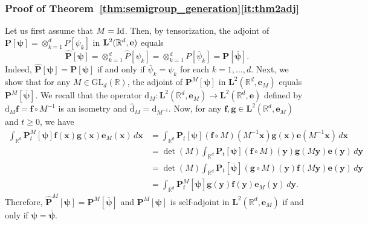 \documentclass[12pt]{amsart}
\numberwithin{equation}{section}
\newcommand{\bb}{\mathbb}
\renewcommand{\ge}{\geqslant}
\newcommand{\ov}{\overline}
\newcommand{\bmrm}[2][2]{\mathbf{#2}^{#1}}
\newcommand{\FsemiM}{\bm{P}^M[\bm{\psi}]}
\newcommand{\LLRe}{\bmrm{L}(\bb R^d,{\bf e})}
\newcommand{\f}{\mathbf{f}}
\newcommand{\g}{\mathbf{g}}
\newcommand{\LLReM}{\bmrm{L}(\bb R^d,\mathbf{e}_M)}
\theoremstyle{definition}
\theoremstyle{assump}
\theoremstyle{remark}
\begin{document}
{\subsubsection{Proof of Theorem~\ref{thm:semigroup_generation}\eqref{it:thm2adj}} Let us first assume that $M={\rm Id}$. Then, by tensorization,  the adjoint of $\bm{P}[\bm\psi]=\otimes_{k=1}^d P[\psi_k]$ in $\LLRe$ equals
\[\widehat{\bm{P}}[\bm\psi]=\otimes_{k=1}^d\widehat{P}[\psi_k]=\otimes_{k=1}^d P[\ov{\psi}_k]=\bm{P}[\ov{\bm\psi}].\]
Indeed, $\widehat{\bm{P}}[\bm\psi]=\bm{P}[\bm\psi]$ if and only if $\ov{\psi}_k=\psi_k$ for each $k=1,\ldots,d$. Next, we show that for any $M\in\mathrm{GL}_d(\bb R)$, the adjoint of $\bm{P}^M[\bm\psi]$ in $\LLReM$ equals ${\bm P}^M[\ov{\bm\psi}]$. We recall that the operator $\mathrm{d}_M:\bmrm{L}(\bb{R}^d,{\mathbf{e}}_M)\to\bmrm{L}(\bb{R}^d,\mathbf{e})$ defined by $\mathrm{d}_M \f=\f\circ M^{-1}$ is an isometry and $\widehat{\mathrm{d}}_M=\mathrm{d}_{M^{-1}}$. Now, for any $\mathbf{f},\mathbf{g}\in\LLReM$ and $t\ge 0$, we have
\begin{align}
	\int_{\bb{R}^d}\bm{P}^M_t[\bm{\psi}] \f(\bm{x}) \g(\bm{x}){\mathbf{e}}_M(\bm{x})\,d\bm{x}&=\int_{\bb{R}^d}\bm{P}_t[\bm{\psi}](\f\circ M)(M^{-1}\bm{x}) \g(\bm{x})\mathbf{e}(M^{-1}\bm{x})\,d\bm{x} \nonumber \\
	&=\det(M)\int_{\bb{R}^d} \bm{P}_t[\bm{\psi}](\f\circ M)(\bm{y})\g(M\bm{y})\mathbf{e}(\bm{y})\,d\bm{y} \nonumber \\
	&=\det(M)\int_{\bb{R}^d}\bm{P}_t[\ov{\bm{\psi}}](\g\circ M)(\bm{y}) \f(M\bm{y})\mathbf{e}(\bm{y})\,d\bm{y} \nonumber \\
	&=\int_{\bb{R}^d}\bm{P}^M_t[\overline{\bm{\psi}}]\g(\bm{y}) \f(\bm{y}){\mathbf{e}}_M(\bm{y})\,d\bm{y}. \nonumber
\end{align}
Therefore, $\widehat{\bm P}^M[\bm\psi]={\bm P}^M[\ov{\bm\psi}]$ and ${\bm P}^M[\bm\psi]$ is self-adjoint in $\LLReM$ if and only if $\bm\psi=\ov{\bm\psi}$.


}
\end{document}
